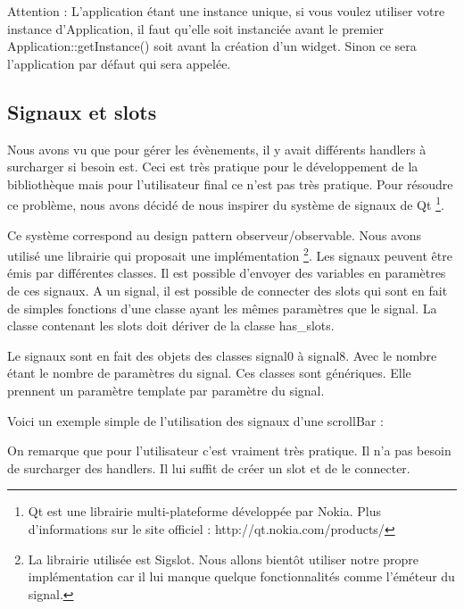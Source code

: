 Attention : L'application étant une instance unique, si vous voulez utiliser votre instance d'Application, il faut qu'elle soit instanciée avant le premier Application::getInstance() soit avant la création d'un widget.
Sinon ce sera l'application par défaut qui sera appelée.

\subsection{Signaux et slots}

Nous avons vu que pour gérer les évènements, il y avait différents handlers à surcharger si besoin est.
Ceci est très pratique pour le développement de la bibliothèque mais pour l'utilisateur final ce n'est pas très pratique.
Pour résoudre ce problème, nous avons décidé de nous inspirer du système de signaux de Qt
\footnote{Qt est une librairie multi-plateforme développée par Nokia. Plus d'informations sur le site officiel : http://qt.nokia.com/products/}.

Ce système correspond au design pattern observeur/observable.
Nous avons utilisé une librairie qui proposait une implémentation
\footnote{La librairie utilisée est Sigslot. Nous allons bientôt utiliser notre propre implémentation car il lui manque quelque fonctionnalités comme l'éméteur du signal.}.
Les signaux peuvent être émis par différentes classes.
Il est possible d'envoyer des variables en paramètres de ces signaux.
A un signal, il est possible de connecter des slots qui sont en fait de simples fonctions d'une classe ayant les mêmes paramètres que le signal.
La classe contenant les slots doit dériver de la classe has\_slots.

Le signaux sont en fait des objets des classes signal0 à signal8. Avec le nombre étant le nombre de paramètres du signal.
Ces classes sont génériques.
Elle prennent un paramètre template par paramètre du signal.

Voici un exemple simple de l'utilisation des signaux d'une scrollBar :



On remarque que pour l'utilisateur c'est vraiment très pratique. Il n'a pas besoin de surcharger des handlers.
Il lui suffit de créer un slot et de le connecter.